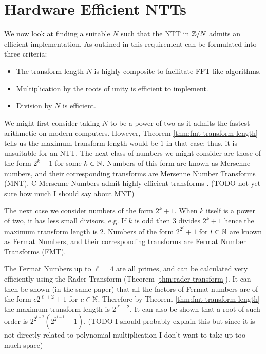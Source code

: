 \section{Hardware Efficient NTTs}%
\label{sec:Hardware Efficient NTTs}

We now look at finding a suitable $N$ such that the NTT in ${\mathbb Z} / N$ admits an efficient implementation. As outlined in \cite{intro-to-fmt} this requirement can be formulated into three criteria:
\begin{itemize}
    \item The transform length $N$ is highly composite to facilitate FFT-like algorithms.
    \item Multiplication by the roots of unity is efficient to implement.
    \item Division by $N$ is efficient.
\end{itemize}

We might first consider taking $N$ to be a power of two as it admits the fastest arithmetic on modern computers. However, Theorem \ref{thm:fmt-transform-length} tells us the maximum transform length would be $1$ in that case; thus, it is unsuitable for an NTT. The next class of numbers we might consider are those of the form $2^k - 1$ for some $k \in {\mathbb N}$. Numbers of this form are known as Mersenne numbers, and their corresponding transforms are Mersenne Number Transforms (MNT). C Mersenne Numbers admit highly efficient transforms \cite{mersenne}. (TODO not yet sure how much I should say about MNT)

The next case we consider numbers of the form $2^k + 1$. When $k$ itself is a power of two, it has less small divisors, e.g. If $k$ is odd then $3$ divides $2^k + 1$ hence the maximum transform length is $2$. Numbers of the form $2^{2^\ell} + 1$ for $l \in {\mathbb N}$ are known as Fermat Numbers, and their corresponding transforms are Fermat Number Transforms (FMT).

The Fermat Numbers up to $\ell = 4$ are all primes, and can be calculated very efficiently using the Rader Transform (Theorem \ref{thm:rader-transform}). It can then be shown (in the same paper) that all the factors of Fermat numbers are of the form $c2^{\ell + 2} + 1$ for $c \in {\mathbb N}$. Therefore by Theorem \ref{thm:fmt-transform-length} the maximum transform length is $2^{\ell + 2}$. It can also be shown that a root of such order is $2^{2^{t-2}}(2^{2^{t-1}} - 1)$. (TODO I should probably explain this but since it is not directly related to polynomial multiplication I don't want to take up too much space)

